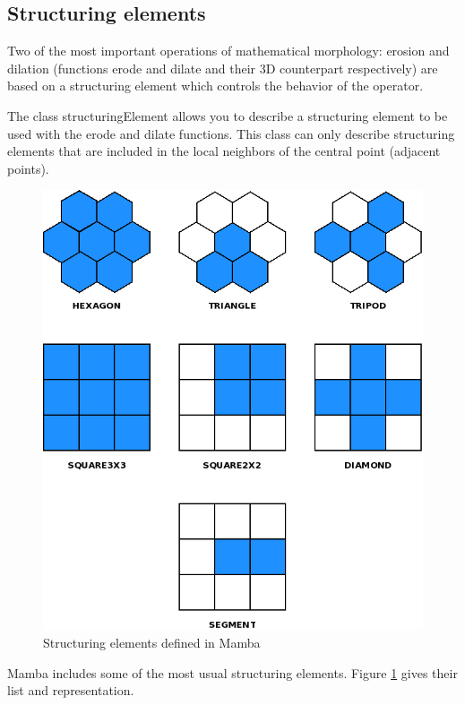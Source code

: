 \documentclass[a4paper,10pt,oneside]{article}
\begin{document}
\subsection{Structuring elements}

Two of the most important operations of mathematical morphology: erosion and
dilation (functions erode and dilate and their 3D counterpart respectively)
are based on a structuring element which controls the behavior of the operator.

The class structuringElement allows you to describe a structuring element to
be used with the erode and dilate functions. This class can only describe
structuring elements that are included in the local 
neighbors of the central point (adjacent points).

\begin{figure}
\centering
\includegraphics[scale=0.3]{figures/se.png}
\caption{Structuring elements defined in Mamba}
\label{fig:se}
\end{figure}

Mamba includes some of the most usual structuring elements. Figure
\ref{fig:se} gives their list and representation.
\end{document}

